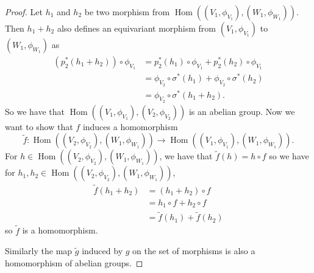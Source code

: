 \documentclass{article}
\newcommand{\Hom}{\operatorname{Hom}}
\begin{document}
\begin{proof}
  Let $h_1$ and $h_2$ be two morphism from $\Hom ((V_1,\phi_{V_1}),(W_1,\phi_{W_1}))$. Then $h_1 + h_2$ also
  defines an equivariant morphism from $(V_1,\phi_{V_1})$ to $(W_1,\phi_{W_1})$ as 
  \begin{align*}
    (p_2^*(h_1 + h_2)) \circ \phi_{V_1} &= p_2^*(h_1) \circ \phi_{V_1} + p_2^*(h_2) \circ \phi_{V_1} \\
                                        &= \phi_{V_2} \circ \sigma^* (h_1) + \phi_{V_2} \circ \sigma^* (h_2) \\
                                        &= \phi_{V_2} \circ \sigma^* (h_1 + h_2).
  \end{align*}
  So we have that $\Hom ((V_1,\phi_{V_1}),(V_2,\phi_{V_2}))$ is an abelian group.
  Now we want to show that $f$ induces a homomorphism 
  $$\tilde f:\Hom ((V_2,\phi_{V_2}),(W_1,\phi_{W_1}))\rightarrow \Hom ((V_1,\phi_{V_1}),(W_1,\phi_{W_1})).$$
  For $h \in \Hom ((V_2,\phi_{V_2}),(W_1,\phi_{W_1}))$, we have that $\tilde f (h) = h \circ f$ so we have for 
  $h_1,h_2 \in \Hom ((V_2,\phi_{V_2}),(W_1,\phi_{W_1}))$, 
\begin{align*}
  \tilde f (h_1 + h_2) &= (h_1 + h_2) \circ f \\
                       &= h_1 \circ f + h_2 \circ f \\
                       &= \tilde f (h_1) + \tilde f (h_2)
\end{align*}
so $\tilde f$ is a homomorphism. 

Similarly the map $\tilde g$ induced by $g$ on the set of morphisms is also a homomorphism of abelian groups.

\end{proof}
\end{document}
